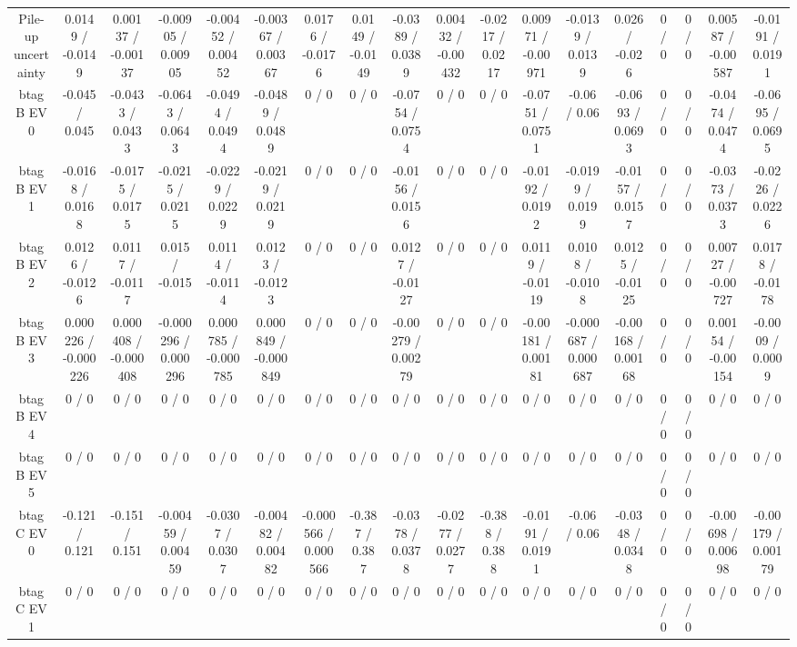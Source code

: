 \documentclass[10pt]{article}
\begin{document}
\begin{table}[htbp]
\begin{center}
\begin{tabular}{|c|c|c|c|c|c|c|c|c|c|c|c|c|c|c|c|c|c|}
  Pile-up uncertainty & 0.0149 / -0.0149 & 0.00137 / -0.00137 & -0.00905 / 0.00905 & -0.00452 / 0.00452 & -0.00367 / 0.00367 & 0.0176 / -0.0176 & 0.0149 / -0.0149 & -0.0389 / 0.0389 & 0.00432 / -0.00432 & -0.0217 / 0.0217 & 0.00971 / -0.00971 & -0.0139 / 0.0139 & 0.026 / -0.026 & 0 / 0 & 0 / 0 & 0.00587 / -0.00587 & -0.0191 / 0.0191 \\ 
  btag B EV 0 & -0.045 / 0.045 & -0.0433 / 0.0433 & -0.0643 / 0.0643 & -0.0494 / 0.0494 & -0.0489 / 0.0489 & 0 / 0 & 0 / 0 & -0.0754 / 0.0754 & 0 / 0 & 0 / 0 & -0.0751 / 0.0751 & -0.06 / 0.06 & -0.0693 / 0.0693 & 0 / 0 & 0 / 0 & -0.0474 / 0.0474 & -0.0695 / 0.0695 \\ 
  btag B EV 1 & -0.0168 / 0.0168 & -0.0175 / 0.0175 & -0.0215 / 0.0215 & -0.0229 / 0.0229 & -0.0219 / 0.0219 & 0 / 0 & 0 / 0 & -0.0156 / 0.0156 & 0 / 0 & 0 / 0 & -0.0192 / 0.0192 & -0.0199 / 0.0199 & -0.0157 / 0.0157 & 0 / 0 & 0 / 0 & -0.0373 / 0.0373 & -0.0226 / 0.0226 \\ 
  btag B EV 2 & 0.0126 / -0.0126 & 0.0117 / -0.0117 & 0.015 / -0.015 & 0.0114 / -0.0114 & 0.0123 / -0.0123 & 0 / 0 & 0 / 0 & 0.0127 / -0.0127 & 0 / 0 & 0 / 0 & 0.0119 / -0.0119 & 0.0108 / -0.0108 & 0.0125 / -0.0125 & 0 / 0 & 0 / 0 & 0.00727 / -0.00727 & 0.0178 / -0.0178 \\ 
  btag B EV 3 & 0.000226 / -0.000226 & 0.000408 / -0.000408 & -0.000296 / 0.000296 & 0.000785 / -0.000785 & 0.000849 / -0.000849 & 0 / 0 & 0 / 0 & -0.00279 / 0.00279 & 0 / 0 & 0 / 0 & -0.00181 / 0.00181 & -0.000687 / 0.000687 & -0.00168 / 0.00168 & 0 / 0 & 0 / 0 & 0.00154 / -0.00154 & -0.0009 / 0.0009 \\ 
  btag B EV 4 & 0 / 0 & 0 / 0 & 0 / 0 & 0 / 0 & 0 / 0 & 0 / 0 & 0 / 0 & 0 / 0 & 0 / 0 & 0 / 0 & 0 / 0 & 0 / 0 & 0 / 0 & 0 / 0 & 0 / 0 & 0 / 0 & 0 / 0 \\ 
  btag B EV 5 & 0 / 0 & 0 / 0 & 0 / 0 & 0 / 0 & 0 / 0 & 0 / 0 & 0 / 0 & 0 / 0 & 0 / 0 & 0 / 0 & 0 / 0 & 0 / 0 & 0 / 0 & 0 / 0 & 0 / 0 & 0 / 0 & 0 / 0 \\ 
  btag C EV 0 & -0.121 / 0.121 & -0.151 / 0.151 & -0.00459 / 0.00459 & -0.0307 / 0.0307 & -0.00482 / 0.00482 & -0.000566 / 0.000566 & -0.387 / 0.387 & -0.0378 / 0.0378 & -0.0277 / 0.0277 & -0.388 / 0.388 & -0.0191 / 0.0191 & -0.06 / 0.06 & -0.0348 / 0.0348 & 0 / 0 & 0 / 0 & -0.00698 / 0.00698 & -0.00179 / 0.00179 \\ 
  btag C EV 1 & 0 / 0 & 0 / 0 & 0 / 0 & 0 / 0 & 0 / 0 & 0 / 0 & 0 / 0 & 0 / 0 & 0 / 0 & 0 / 0 & 0 / 0 & 0 / 0 & 0 / 0 & 0 / 0 & 0 / 0 & 0 / 0 & 0 / 0 \\ 

\end{tabular}
\end{center}
\end{table}
\end{document}
